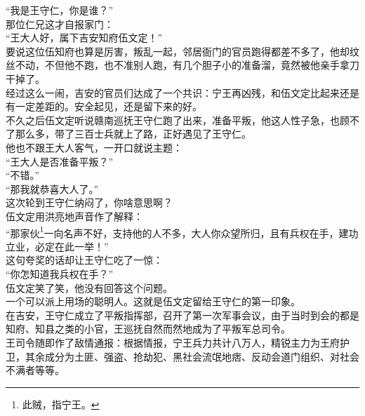 \begin{multicols}{\theparacolNo}
“我是王守仁，你是谁？”\\

那位仁兄这才自报家门：\\

“王大人好，属下吉安知府伍文定！”\\

要说这位伍知府也算是厉害，叛乱一起，邻居衙门的官员跑得都差不多了，他却纹丝不动，不但他不跑，也不准别人跑，有几个胆子小的准备溜，竟然被他亲手拿刀干掉了。\\

经过这么一闹，吉安的官员们达成了一个共识：宁王再凶残，和伍文定比起来还是有一定差距的。安全起见，还是留下来的好。\\

不久之后伍文定听说赣南巡抚王守仁跑了出来，准备平叛，他这人性子急，也顾不了那么多，带了三百士兵就上了路，正好遇见了王守仁。\\

他也不跟王大人客气，一开口就说主题：\\

“王大人是否准备平叛？”\\

“不错。”\\

“那我就恭喜大人了。”\\

这次轮到王守仁纳闷了，你啥意思啊？\\

伍文定用洪亮地声音作了解释：\\

“那家伙\footnote{此贼，指宁王。}一向名声不好，支持他的人不多，大人你众望所归，且有兵权在手，建功立业，必定在此一举！”\\

这句夸奖的话却让王守仁吃了一惊：\\

“你怎知道我兵权在手？”\\

伍文定笑了笑，他没有回答这个问题。\\

一个可以派上用场的聪明人。这就是伍文定留给王守仁的第一印象。\\

在吉安，王守仁成立了平叛指挥部，召开了第一次军事会议，由于当时到会的都是知府、知县之类的小官，王巡抚自然而然地成为了平叛军总司令。\\

王司令随即作了敌情通报：根据情报，宁王兵力共计八万人，精锐主力为王府护卫，其余成分为土匪、强盗、抢劫犯、黑社会流氓地痞、反动会道门组织、对社会不满者等等。\\


\end{multicols}
